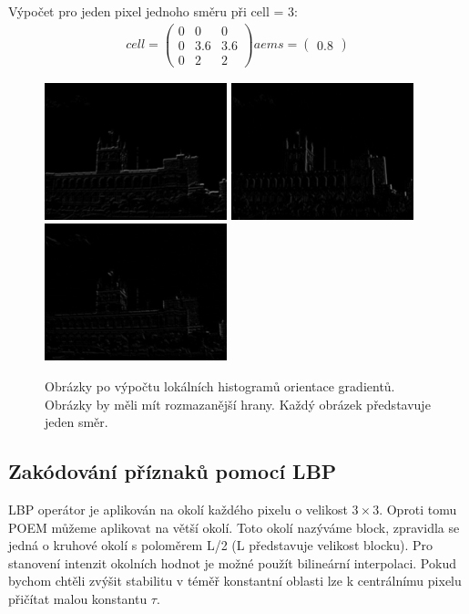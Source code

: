 \documentclass{report}
\begin{document}
Výpočet pro jeden pixel jednoho směru při cell = 3:
\begin{align}
	\label{aems_detail}
		cell = \begin{pmatrix}0 & 0 & 0 \\ 0 & 3.6 & 3.6 \\ 0 & 2 & 2 \end{pmatrix}
		aems = \begin{pmatrix}0.8 \end{pmatrix}
\end{align}

\begin{figure}[H]
	\centering
	\includegraphics[width=150pt]{./img/aems0.png}
	\includegraphics[width=150pt]{./img/aems1.png}
	\includegraphics[width=150pt]{./img/aems2.png}
	\caption{Obrázky po výpočtu lokálních histogramů orientace gradientů. Obrázky by měli mít rozmazanější hrany. Každý obrázek představuje jeden směr.}
\end{figure}

\subsection{Zakódování příznaků pomocí LBP}
LBP operátor je aplikován na okolí každého pixelu o velikost $3 \times 3$. Oproti tomu POEM můžeme aplikovat na větší okolí. Toto okolí nazýváme block, zpravidla se jedná o kruhové okolí s poloměrem L/2 (L představuje velikost blocku). Pro stanovení intenzit okolních hodnot je možné použít bilineární interpolaci. Pokud bychom chtěli zvýšit stabilitu v téměř konstantní oblasti lze k centrálnímu pixelu přičítat malou konstantu $\tau$.
\end{document}
